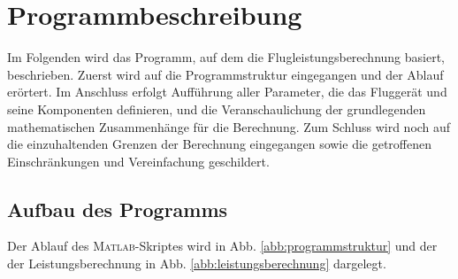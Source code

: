 \chapter{Programmbeschreibung}
\label{chap:Programmbeschreibung}
Im Folgenden wird das Programm, auf dem die Flugleistungsberechnung basiert, beschrieben. Zuerst wird auf die Programmstruktur eingegangen und der Ablauf erörtert. Im Anschluss erfolgt Aufführung aller Parameter, die das Fluggerät und seine Komponenten definieren, und die Veranschaulichung der grundlegenden mathematischen Zusammenhänge für die Berechnung. Zum Schluss wird noch auf die einzuhaltenden Grenzen der Berechnung eingegangen sowie die getroffenen Einschränkungen und Vereinfachung geschildert.

\section{Aufbau des Programms}
\label{sec:aufbau_des_programms}
Der Ablauf des \textsc{Matlab}-Skriptes wird in Abb. \ref{abb:programmstruktur} und der der Leistungsberechnung in Abb. \ref{abb:leistungsberechnung} dargelegt.


